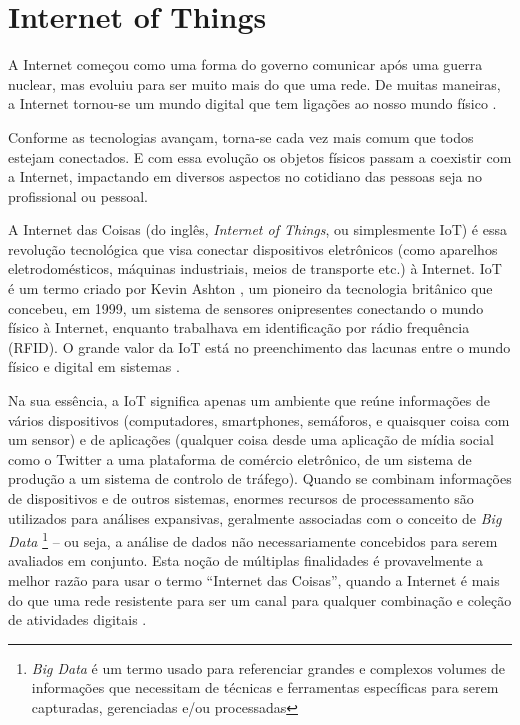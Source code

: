 \section{Internet of Things}
\label{sec:iot}

A Internet começou como uma forma do governo comunicar após uma guerra nuclear, mas evoluiu para ser muito mais do que uma rede. De muitas maneiras, a Internet tornou-se um mundo digital que tem ligações ao nosso mundo físico \cite{BrasilEscola}.

Conforme as tecnologias avançam, torna-se cada vez mais comum que todos estejam conectados. E com essa evolução os objetos físicos passam a coexistir com a Internet, impactando em diversos aspectos no cotidiano das pessoas seja no profissional ou pessoal.

A Internet das Coisas (do inglês, \textit{Internet of Things}, ou simplesmente IoT) é essa revolução tecnológica que visa conectar dispositivos eletrônicos (como aparelhos eletrodomésticos, máquinas industriais, meios de transporte etc.) à Internet. IoT é um termo criado por Kevin Ashton \cite{Kevin}, um pioneiro da tecnologia britânico que concebeu, em 1999, um sistema de sensores onipresentes conectando o mundo físico à Internet, enquanto trabalhava em identificação por rádio frequência (RFID). O grande valor da IoT está no preenchimento das lacunas entre o mundo físico e digital em sistemas \cite{Amazon}.

Na sua essência, a IoT significa apenas um ambiente que reúne informações de vários dispositivos (computadores, smartphones, semáforos, e quaisquer coisa com um sensor) e de aplicações (qualquer coisa desde uma aplicação de mídia social como o Twitter a uma plataforma de comércio eletrônico, de um sistema de produção a um sistema de controlo de tráfego). Quando se combinam informações de dispositivos e de outros sistemas, enormes recursos de processamento são utilizados para análises expansivas, geralmente associadas com o conceito de \textit{Big Data} \footnote{\textit{Big Data} é um termo usado para referenciar grandes e complexos volumes de informações que necessitam de técnicas e ferramentas específicas para serem capturadas, gerenciadas e/ou processadas} – ou seja, a análise de dados não necessariamente concebidos para serem avaliados em conjunto. Esta noção de múltiplas finalidades é provavelmente a melhor razão para usar o termo “Internet das Coisas”, quando a Internet é mais do que uma rede resistente para ser um canal para qualquer combinação e coleção de atividades digitais \cite{ComputerWorld}.

